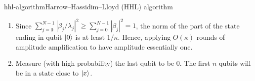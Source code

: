 \begin{topic}{hhl-algorithm}{Harrow--Hassidim--Lloyd (HHL) algorithm}
\begin{enumerate}[label=(\arabic*)]
        \[ \sum_{j = 0}^{N - 1} \beta_j \ket{v_j} \otimes \left( \tfrac{1}{\kappa \lambda_i} \ket{0} + \sqrt{1 - \tfrac{1}{(\kappa \lambda_i)^2}} \ket{1} \right) = \frac{1}{\kappa} \underbrace{\sum_{j = 0}^{N - 1} \beta_j \lambda_j^{-1} \ket{v_j}}_{\propto \ket{x}} \otimes \ket{0} + \ket{\phi} \otimes \ket{1} \]
        for some (unnormalized) state $\ket{\phi}$.
        \item Since $\sum_{j = 0}^{N - 1} |\beta_j / \lambda_j|^2 \ge \sum_{j = 0}^{N - 1} |\beta_j|^2 = 1$, the norm of the part of the state ending in qubit $|0\rangle$ is at least $1 / \kappa$. Hence, applying $O(\kappa)$ rounds of amplitude amplification to have amplitude essentially one.
        \item Measure (with high probability) the last qubit to be $0$. The first $n$ qubits will be in a state close to $|x\rangle$.
    \end{enumerate}
\end{topic}



